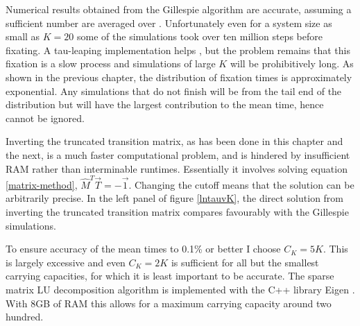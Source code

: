 
Numerical results obtained from the Gillespie algorithm are accurate, assuming a sufficient number are averaged over \cite{Gillespie1977}. 
Unfortunately even for a system size as small as $K=20$ some of the simulations took over ten million steps before fixating. 
A tau-leaping implementation helps \cite{Cao2006}, but the problem remains that this fixation is a slow process and simulations of large $K$ will be prohibitively long. 
As shown in the previous chapter, the distribution of fixation times is approximately exponential. 
Any simulations that do not finish will be from the tail end of the distribution but will have the largest contribution to the mean time, hence cannot be ignored. 

Inverting the truncated transition matrix, as has been done in this chapter and the next, is a much faster computational problem, and is hindered by insufficient RAM rather than interminable runtimes. 
Essentially it involves solving equation \ref{matrix-method}, $\hat{M}^T\vec{T} = -\vec{1}$. %
Changing the cutoff means that the solution can be arbitrarily precise. 
In the left panel of figure \ref{lntauvK}, the direct solution from inverting the truncated transition matrix compares favourably with the Gillespie simulations. 

To ensure accuracy of the mean times to 0.1\% or better I choose $C_K=5K$. 
This is largely excessive and even $C_K=2K$ is sufficient for all but the smallest carrying capacities, for which it is least important to be accurate. 
The sparse matrix LU decomposition algorithm is implemented with the C++ library Eigen \cite{eigenweb}. 
With 8GB of RAM this allows for a maximum carrying capacity around two hundred. 

